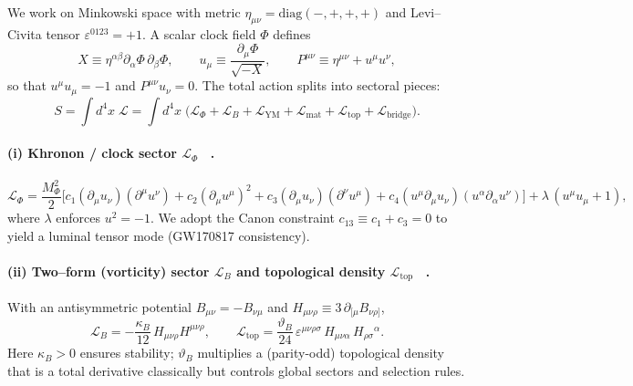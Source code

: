 \documentclass[10pt,reprint,aps,onecolumn,nofootinbib]{revtex4-2}
\begin{document}
We work on Minkowski space with metric \(\eta_{\mu\nu}=\mathrm{diag}(-,+,+,+)\) and Levi–Civita tensor \(\varepsilon^{0123}=+1\).
A scalar clock field \(\Phi\) defines
\[
    X \equiv \eta^{\alpha\beta}\partial_\alpha\Phi\,\partial_\beta\Phi,\qquad
    u_\mu \equiv \frac{\partial_\mu\Phi}{\sqrt{-X}},\qquad
    P^{\mu\nu} \equiv \eta^{\mu\nu}+u^\mu u^\nu,
\]
so that \(u^\mu u_\mu=-1\) and \(P^{\mu\nu}u_\nu=0\).
The total action splits into sectoral pieces:
\begin{equation}
S=\int d^4x\;\mathcal{L}
=\int d^4x\;\Big(
\mathcal{L}_\Phi
+\mathcal{L}_B
+\mathcal{L}_{\mathrm{YM}}
+\mathcal{L}_{\mathrm{mat}}
+\mathcal{L}_{\mathrm{top}}
+\mathcal{L}_{\mathrm{bridge}}
\Big).
\label{eq:S_total_app}
\end{equation}

\paragraph*{(i) Khronon / clock sector \(\mathcal{L}_\Phi\)~ \cite{sstLagrangian}.}
    \begin{equation}
    \mathcal{L}_\Phi
    =\frac{M_\Phi^2}{2}\Big[
        c_1(\partial_\mu u_\nu)(\partial^\mu u^\nu)
        +c_2(\partial_\mu u^\mu)^2
        +c_3(\partial_\mu u_\nu)(\partial^\nu u^\mu)
        +c_4(u^\mu\partial_\mu u_\nu)(u^\alpha\partial_\alpha u^\nu)
        \Big]
    +\lambda\,(u^\mu u_\mu+1),
    \label{eq:Lphi_app}
    \end{equation}
    where \(\lambda\) enforces \(u^2=-1\). We adopt the Canon constraint \(c_{13}\equiv c_1+c_3=0\) to yield a luminal tensor mode (GW170817 consistency).

\paragraph*{(ii) Two–form (vorticity) sector \(\mathcal{L}_B\) and topological density \(\mathcal{L}_{\mathrm{top}}\)~ \cite{sstLagrangian}.}
    With an antisymmetric potential \(B_{\mu\nu}=-B_{\nu\mu}\) and \(H_{\mu\nu\rho}\equiv 3\,\partial_{[\mu}B_{\nu\rho]}\),
    \begin{equation}
    \mathcal{L}_B
    =-\frac{\kappa_B}{12}\,H_{\mu\nu\rho}H^{\mu\nu\rho},
    \qquad
    \mathcal{L}_{\mathrm{top}}
    =\frac{\vartheta_B}{24}\,
    \varepsilon^{\mu\nu\rho\sigma}\,
    H_{\mu\nu\alpha}\,H_{\rho\sigma}{}^{\alpha}.
    \label{eq:LB_app}
    \end{equation}
    Here \(\kappa_B>0\) ensures stability; \(\vartheta_B\) multiplies a (parity-odd) topological density that is a total derivative classically but controls global sectors and selection rules.
\end{document}
